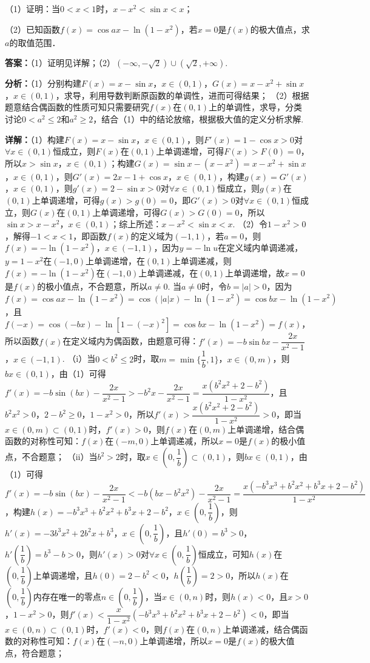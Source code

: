 \begin{question}[points=10]
（1）证明：当$0<x<1$时，$x-x^{2}<\sin x<x$；

（2）已知函数$f(x)=\cos ax-\ln(1-x^{2})$，若$x=0$是$f(x)$的极大值点，求$a$的取值范围．
\begin{solution}
\textbf{答案：}（1）证明见详解；（2）$(-\infty,-\sqrt{2})\cup(\sqrt{2},+\infty)$.

\textbf{分析：}（1）分别构建$F(x)=x-\sin x$，$x\in(0,1)$，$G(x)=x-x^{2}+\sin x$，$x\in(0,1)$，求导，利用导数判断原函数的单调性，进而可得结果；
（2）根据题意结合偶函数的性质可知只需要研究$f(x)$在$(0,1)$上的单调性，求导，分类讨论$0<a^{2}\le 2$和$a^{2}\ge 2$，结合（1）中的结论放缩，根据极大值的定义分析求解.

\textbf{详解：}（1）构建$F(x)=x-\sin x$，$x\in(0,1)$，则$F'(x)=1-\cos x>0$对$\forall x\in(0,1)$恒成立，则$F(x)$在$(0,1)$上单调递增，可得$F(x)>F(0)=0$，所以$x>\sin x$，$x\in(0,1)$；构建$G(x)=\sin x-(x-x^{2})=x-x^{2}+\sin x$，$x\in(0,1)$，则$G'(x)=2x-1+\cos x$，$x\in(0,1)$，构建$g(x)=G'(x)$，$x\in(0,1)$，则$g'(x)=2-\sin x>0$对$\forall x\in(0,1)$恒成立，则$g(x)$在$(0,1)$上单调递增，可得$g(x)>g(0)=0$，即$G'(x)>0$对$\forall x\in(0,1)$恒成立，则$G(x)$在$(0,1)$上单调递增，可得$G(x)>G(0)=0$，所以$\sin x>x-x^{2}$，$x\in(0,1)$；综上所述：$x-x^{2}<\sin x<x$.
（2）令$1-x^{2}>0$，解得$-1<x<1$，即函数$f(x)$的定义域为$(-1,1)$，若$a=0$，则$f(x)=-\ln(1-x^{2})$，$x\in(-1,1)$，因为$y=-\ln u$在定义域内单调递减，$y=1-x^{2}$在$(-1,0)$上单调递增，在$(0,1)$上单调递减，则$f(x)=-\ln(1-x^{2})$在$(-1,0)$上单调递减，在$(0,1)$上单调递增，故$x=0$是$f(x)$的极小值点，不合题意，所以$a\neq0$.
当$a\neq0$时，令$b=|a|>0$，因为$f(x)=\cos ax-\ln(1-x^{2})=\cos(|a|x)-\ln(1-x^{2})=\cos bx-\ln(1-x^{2})$，且$f(-x)=\cos(-bx)-\ln[1-(-x)^{2}]=\cos bx-\ln(1-x^{2})=f(x)$，所以函数$f(x)$在定义域内为偶函数，由题意可得：$f'(x)=-b\sin bx-\dfrac{2x}{x^{2}-1}$，$x\in(-1,1)$.
（i）当$0<b^{2}\le 2$时，取$m=\min\{\dfrac{1}{b},1\}$，$x\in(0,m)$，则$bx\in(0,1)$，由（1）可得$f'(x)=-b\sin(bx)-\dfrac{2x}{x^{2}-1}>-b^{2}x-\dfrac{2x}{x^{2}-1}=\dfrac{x(b^{2}x^{2}+2-b^{2})}{1-x^{2}}$，且$b^{2}x^{2}>0$，$2-b^{2}\ge0$，$1-x^{2}>0$，所以$f'(x)>\dfrac{x(b^{2}x^{2}+2-b^{2})}{1-x^{2}}>0$，即当$x\in(0,m)\subset(0,1)$时，$f'(x)>0$，则$f(x)$在$(0,m)$上单调递增，结合偶函数的对称性可知：$f(x)$在$(-m,0)$上单调递减，所以$x=0$是$f(x)$的极小值点，不合题意；
（ii）当$b^{2}>2$时，取$x\in(0,\dfrac{1}{b})\subset(0,1)$，则$bx\in(0,1)$，由（1）可得$f'(x)=-b\sin(bx)-\dfrac{2x}{x^{2}-1}<-b(bx-b^{2}x^{2})-\dfrac{2x}{x^{2}-1}=\dfrac{x(-b^{3}x^{3}+b^{2}x^{2}+b^{3}x+2-b^{2})}{1-x^{2}}$，构建$h(x)=-b^{3}x^{3}+b^{2}x^{2}+b^{3}x+2-b^{2}$，$x\in(0,\dfrac{1}{b})$，则$h'(x)=-3b^{3}x^{2}+2b^{2}x+b^{3}$，$x\in(0,\dfrac{1}{b})$，且$h'(0)=b^{3}>0$，$h'(\dfrac{1}{b})=b^{3}-b>0$，则$h'(x)>0$对$\forall x\in(0,\dfrac{1}{b})$恒成立，可知$h(x)$在$(0,\dfrac{1}{b})$上单调递增，且$h(0)=2-b^{2}<0$，$h(\dfrac{1}{b})=2>0$，所以$h(x)$在$(0,\dfrac{1}{b})$内存在唯一的零点$n\in(0,\dfrac{1}{b})$，当$x\in(0,n)$时，则$h(x)<0$，且$x>0$，$1-x^{2}>0$，则$f'(x)<\dfrac{x}{1-x^{2}}(-b^{3}x^{3}+b^{2}x^{2}+b^{3}x+2-b^{2})<0$，即当$x\in(0,n)\subset(0,1)$时，$f'(x)<0$，则$f(x)$在$(0,n)$上单调递减，结合偶函数的对称性可知：$f(x)$在$(-n,0)$上单调递增，所以$x=0$是$f(x)$的极大值点，符合题意；

\end{solution}
\end{question}
